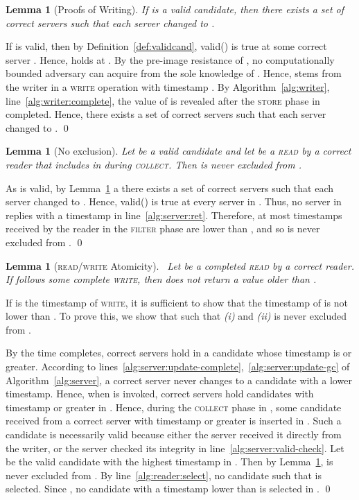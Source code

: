 \documentclass[10pt,conference,compsocconf]{IEEEtran}
\newtheorem{la}[defn]{Lemma}
\newenvironment{prooff}{\vspace{1ex}\noindent{\bf Proof:}\hspace{0.5em}}
	{\hfill\qed\vspace{1em}}
\begin{document}
\begin{la}[Proofs of Writing] \label{la:pow}
If  is a valid candidate, then there exists a set  of  correct servers such that each server  changed  to .
\end{la}
\begin{prooff}
If  is valid, then by Definition~\ref{def:validcand}, \textsf{valid}() is true at some correct server . Hence,  holds at . By the pre-image resistance of , no computationally bounded adversary can acquire  from the sole knowledge of . Hence,  stems from the writer in a \textsc{write} operation  with timestamp . By Algorithm~\ref{alg:writer}, line~\ref{alg:writer:complete}, the value of  is revealed after the \textsc{store} phase in  completed. Hence, there exists a set  of  correct servers such that each server  changed  to .
\end{prooff}

\begin{la}[No exclusion]\label{la:noexclusion}
Let  be a valid candidate and let  be a \textsc{read} by a correct reader that includes  in  during \textsc{collect}. Then  is never excluded from .
\end{la}
\begin{prooff}
As  is valid, by Lemma~\ref{la:pow} a there exists a set  of  correct servers such that each server  changed  to . Hence, \textsf{valid}() is true at every server in . Thus, no server in  replies with a timestamp  in line~\ref{alg:server:ret}.
Therefore, at most  timestamps received by the reader in the \textsc{filter} phase are lower than , and so  is never excluded from .
\end{prooff}

\begin{la}[\textsc{read}/\textsc{write} Atomicity]~\label{la:rwatomic}
Let  be a completed \textsc{read} by a correct reader. If  follows some complete \textsc{write}, then  does not return a value older than .
\end{la}
\begin{prooff}
If  is the timestamp of \textsc{write}, it is sufficient to show that the timestamp of  is not lower than . To prove this, we show that  such that \emph{(i)}  and \emph{(ii)}  is never excluded from .

By the time  completes,  correct servers hold in  a candidate whose timestamp is  or greater. According to lines~\ref{alg:server:update-complete},~\ref{alg:server:update-gc} of Algorithm~\ref{alg:server}, a correct server never changes  to a candidate with a lower timestamp. Hence, when  is invoked,  correct servers hold candidates with timestamp  or greater in . Hence, during the \textsc{collect} phase in , some candidate received from a correct server with timestamp  or greater is inserted in . Such a candidate is necessarily valid because either the server received it directly from the writer, or the server checked its integrity in line~\ref{alg:server:valid-check}. Let  be the valid candidate with the highest timestamp in . Then by Lemma~\ref{la:noexclusion},  is never excluded from . By line~\ref{alg:reader:select}, no candidate  such that  is selected. Since , no candidate with a timestamp lower than  is selected in .
\end{prooff}
\end{document}
